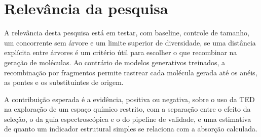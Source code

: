\section{Relevância da pesquisa}
\label{sec:relevancia}

A relevância desta pesquisa está em testar, com baseline, controle de tamanho, um concorrente sem árvore e um limite superior de diversidade, se uma distância explícita entre árvores é um critério útil para escolher o que recombinar na geração de moléculas. Ao contrário de modelos generativos treinados, a recombinação por fragmentos permite rastrear cada molécula gerada até os anéis, as pontes e os substituintes de origem.

A contribuição esperada é a evidência, positiva ou negativa, sobre o uso da TED na exploração de um espaço químico restrito, com a separação entre o efeito da seleção, o da guia espectroscópica e o do pipeline de validade, e uma estimativa de quanto um indicador estrutural simples se relaciona com a absorção calculada.
